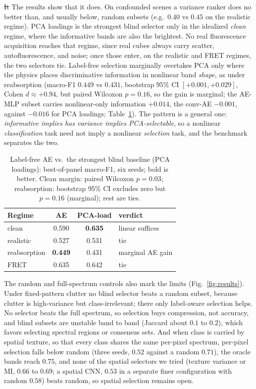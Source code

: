 \documentclass{article}
\makeatletter
\providecommand{\DIFadd}[1]{{\protect\color[rgb]{0.85,0,0}#1}} %
\providecommand{\DIFdel}[1]{{\protect\color[gray]{0.5}\sout{#1}}} %
\providecommand{\DIFaddbegin}{} %
\providecommand{\DIFaddend}{} %
\providecommand{\DIFdelbegin}{} %
\providecommand{\DIFdelend}{} %
\let\sout@orig\sout %
\renewcommand{\sout}[1]{\ifmmode\text{\sout@orig{\ensuremath{#1}}}\else\sout@orig{#1}\fi} %
\makeatother
\begin{document}
\DIFdelbegin \DIFdel{It }\DIFdelend \DIFaddbegin \DIFadd{The results show that it }\DIFaddend does. On confounded scenes a variance ranker does no better than, and usually below, random subsets (e.g.\ $0.40$ vs $0.45$ on the realistic regime). PCA loadings is the
strongest blind selector only in the idealized \emph{clean} regime, where the informative
bands are also the brightest. No real fluorescence acquisition reaches that regime, since
real cubes always carry scatter, autofluorescence, and noise; once those enter, on the
realistic and FRET regimes, the two selectors tie. Label-free selection marginally overtakes PCA only
where the physics places discriminative information in nonlinear band \emph{shape}, as under
reabsorption (macro-F1 $0.449$ vs $0.431$, bootstrap $95\%$ CI $[+0.001,+0.029]$, Cohen
$d\approx+0.94$, but paired Wilcoxon $p=0.16$, so the gain is marginal; the AE-MLP subset carries nonlinear-only
information $+0.014$, the conv-AE $-0.001$, against $-0.016$ for PCA loadings; Table~\ref{tab:battery}). The pattern is a general one:
\emph{informative implies has variance implies PCA-selectable}, so a nonlinear
\emph{classification} task need not imply a nonlinear \emph{selection} task, and the
benchmark separates the two.

\begin{table}[t]
\caption{Label-free AE vs.\ the strongest blind baseline (PCA loadings): best-of-panel macro-F1, six seeds; bold is better. Clean margin: paired Wilcoxon $p=0.03$; reabsorption: bootstrap $95\%$ CI excludes zero but $p=0.16$ (marginal); rest are ties.}
\label{tab:battery}
\centering
\renewcommand{\arraystretch}{1.2}
\begin{tabular*}{\columnwidth}{@{\extracolsep{\fill}}lccl@{}}
\toprule
Regime & AE & PCA-load & verdict \\
\midrule
clean & 0.590 & \textbf{0.635} & linear suffices \\
realistic & 0.527 & 0.531 & tie \\
reabsorption & \textbf{0.449} & 0.431 & marginal AE gain \\
FRET & 0.635 & 0.642 & tie \\
\bottomrule
\end{tabular*}
\end{table}


The random and full-spectrum controls also mark the limits (Fig.~\ref{fig:results}).
Under fixed-pattern clutter no blind selector beats a random subset, because clutter is
high-variance but class-irrelevant; there only label-aware selection helps. No selector
beats the full spectrum, so selection buys compression, not accuracy, and blind subsets
are unstable band to band (Jaccard about $0.1$ to $0.2$), which favors selecting spectral
regions or consensus sets. And when class is carried by spatial texture, so that every
class shares the same per-pixel spectrum, per-pixel selection falls below random (three seeds, $0.52$ against a random $0.71$), the oracle bands reach $0.75$, and none of the spatial selectors we tried
(texture variance or MI, $0.66$ to $0.69$; a spatial CNN, $0.53$ in a separate finer configuration with random $0.58$) beats random, so spatial selection remains open.
\end{document}
